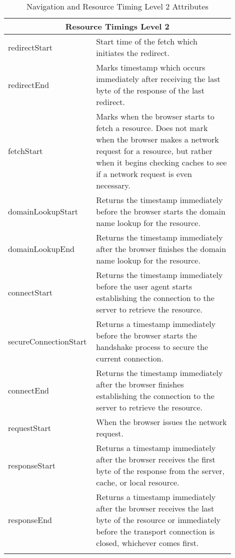 \begin{center}
\begin{longtable}{ | p{0.3\linewidth} | p{0.6\linewidth} | }
	\hline
	\multicolumn{2}{|c|}{ \cellcolor{lightgrey} Resource Timings Level 2} \\
	\hline
	redirectStart & Start time of the fetch which initiates the redirect. \\
	\hline
	redirectEnd & Marks timestamp which occurs immediately after receiving the last byte of the response of the last redirect. \\
	\hline
	fetchStart & Marks when the browser starts to fetch a resource. Does not mark when the browser makes a network request for a resource, but rather when it begins checking caches to see if a network request is even necessary.  \\ %
	\hline
	domainLookupStart & Returns the timestamp immediately before the browser starts the domain name lookup for the resource. \\
	\hline
	domainLookupEnd & Returns the timestamp immediately after the browser finishes the domain name lookup for the resource. \\
	\hline
	connectStart & Returns the timestamp immediately before the user agent starts establishing the connection to the server to retrieve the resource. \\
	\hline
	secureConnectionStart & Returns a timestamp immediately before the browser starts the handshake process to secure the current connection.  \\
	\hline
	connectEnd & Returns the timestamp immediately after the browser finishes establishing the connection to the server to retrieve the resource.  \\
	\hline
	requestStart & When the browser issues the network request.  \\%
	\hline
	responseStart & Returns a timestamp immediately after the browser receives the first byte of the response from the server, cache, or local resource. \\
	\hline
	responseEnd & Returns a timestamp immediately after the browser receives the last byte of the resource or immediately before the transport connection is closed, whichever comes first. \\
	\hline
	\caption{Navigation and Resource Timing Level 2 Attributes} %
	\label{table:navigation_resource_attributes}
	\end{longtable}
\end{center}


